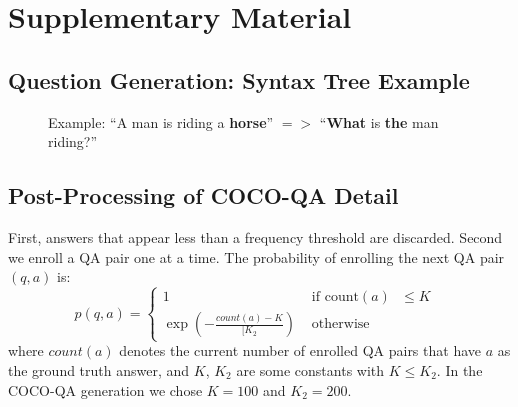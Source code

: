 \documentclass{article}
\renewcommand{\#}[1]{\textbf{#1}}
\begin{document}



\clearpage
\appendix
\onecolumn
\section{Supplementary Material}
\subsection{Question Generation: Syntax Tree Example}
\begin{figure}[h!]
    \centering
    \small
    \vspace{5mm}
    \caption{Example: ``A man is riding a \textbf{horse}'' $=>$ ``\textbf{What} is \textbf{the} man riding?''}
    \label{fig:what_gen}
\end{figure}

\subsection{Post-Processing of COCO-QA Detail}
\label{app:post_process}
First, answers that appear less than a frequency threshold are discarded. 
Second we enroll a QA pair one at a time. 
The probability of enrolling the next QA pair $(q, a)$ is:
\begin{equation}
p(q, a) = \left\{ \begin{array}{cl}
1 &\mbox{ if count$(a)$ $\le K$ } \\
\exp\left(-\frac{count(a) - K}{[K_2}\right) &\mbox{ otherwise }
\end{array} \right.
\end{equation}
where $count(a)$ denotes the current number of enrolled QA pairs that have $a$
as the ground truth answer, and $K$, $K_2$ are some constants with $K \le
K_2$. In the COCO-QA generation we chose $K = 100$ and $K_2 = 200$. 

\clearpage
\end{document}
